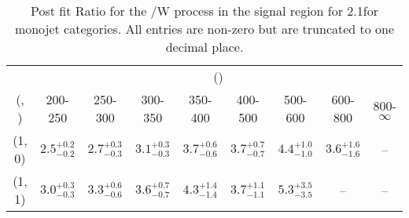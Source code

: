 \begin{table}[h!]
\tiny
\centering
\caption{Post fit Ratio for the \ttbar/W process in the signal region for 2.1\ifb for monojet categories. All entries are non-zero but are truncated to one decimal place.\label{tab:ratioseppost_sig_ttw_mono}}
\begin{tabular}
{ccccccccc}
	\hline\hline
	& \multicolumn{8}{c}{\scalht (\gev)} \\ 
	 (\njet,  \nb) & 200-250 & 250-300 & 300-350 & 350-400 & 400-500 & 500-600 & 600-800 & 800-$\infty$ \\ [0.8ex] 
\hline
	(1, 0) & $2.5^{+ 0.2 }_{- 0.2 }$ & $2.7^{+ 0.3 }_{- 0.3 }$ & $3.1^{+ 0.3 }_{- 0.3 }$ & $3.7^{+ 0.6 }_{- 0.6 }$ & $3.7^{+ 0.7 }_{- 0.7 }$ & $4.4^{+ 1.0 }_{- 1.0 }$ & $3.6^{+ 1.6 }_{- 1.6 }$ & -- \\[0.5ex] 
	(1, 1) & $3.0^{+ 0.3 }_{- 0.3 }$ & $3.3^{+ 0.6 }_{- 0.6 }$ & $3.6^{+ 0.7 }_{- 0.7 }$ & $4.3^{+ 1.4 }_{- 1.4 }$ & $3.7^{+ 1.1 }_{- 1.1 }$ & $5.3^{+ 3.5 }_{- 3.5 }$ & -- & -- \\[0.5ex] 
	\hline
	\hline
\end{tabular}
\end{table}
